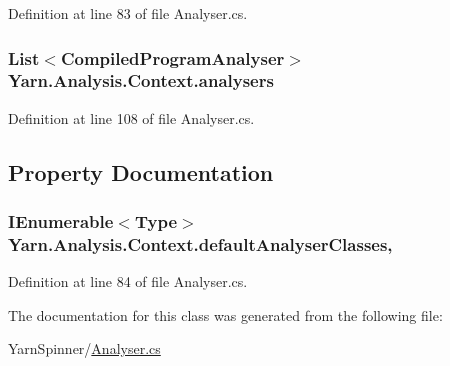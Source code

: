 Definition at line 83 of file Analyser.\-cs.

\hypertarget{a00051_aa5c7eaa90ad9c47969a3b336080d8991}{
\subsubsection[{analysers}]{\setlength{\rightskip}{0pt plus 5cm}List$<${\bf Compiled\-Program\-Analyser}$>$ Yarn.\-Analysis.\-Context.\-analysers\hspace{0.3cm}{\ttfamily [private]}}}\label{a00051_aa5c7eaa90ad9c47969a3b336080d8991}


Definition at line 108 of file Analyser.\-cs.



\subsection{Property Documentation}
\hypertarget{a00051_afdf24f2512251c2203ba1bde8f4a0f90}{
\subsubsection[{default\-Analyser\-Classes}]{\setlength{\rightskip}{0pt plus 5cm}I\-Enumerable$<$Type$>$ Yarn.\-Analysis.\-Context.\-default\-Analyser\-Classes\hspace{0.3cm}{\ttfamily [get]}, {\ttfamily [package]}}}\label{a00051_afdf24f2512251c2203ba1bde8f4a0f90}


Definition at line 84 of file Analyser.\-cs.



The documentation for this class was generated from the following file\-:\begin{DoxyCompactItemize}
\item 
Yarn\-Spinner/\hyperlink{a00293}{Analyser.\-cs}\end{DoxyCompactItemize}
